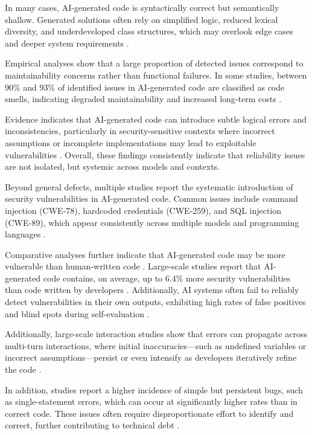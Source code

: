 \documentclass[conference]{IEEEtran}
\begin{document}
In many cases, AI-generated code is syntactically correct but semantically shallow. Generated solutions often rely on simplified logic, reduced lexical diversity, and underdeveloped class structures, which may overlook edge cases and deeper system requirements \cite{cotroneo_human-written_2025}.

Empirical analyses show that a large proportion of detected issues correspond to maintainability concerns rather than functional failures. In some studies, between 90\% and 93\% of identified issues in AI-generated code are classified as code smells, indicating degraded maintainability and increased long-term costs \cite{sabra_assessing_2025}.

Evidence indicates that AI-generated code can introduce subtle logical errors and inconsistencies, particularly in security-sensitive contexts where incorrect assumptions or incomplete implementations may lead to exploitable vulnerabilities \cite{sandoval_lost_2022}. Overall, these findings consistently indicate that reliability issues are not isolated, but systemic across models and contexts.

Beyond general defects, multiple studies report the systematic introduction of security vulnerabilities in AI-generated code. Common issues include command injection (CWE-78), hardcoded credentials (CWE-259), and SQL injection (CWE-89), which appear consistently across multiple models and programming languages \cite{schreiber_security_2026}.

Comparative analyses further indicate that AI-generated code may be more vulnerable than human-written code \cite{cotroneo_human-written_2025}. Large-scale studies report that AI-generated code contains, on average, up to 6.4\% more security vulnerabilities than code written by developers \cite{kim_security_2025}. Additionally, AI systems often fail to reliably detect vulnerabilities in their own outputs, exhibiting high rates of false positives and blind spots during self-evaluation \cite{gong_how_2025}.

Additionally, large-scale interaction studies show that errors can propagate across multi-turn interactions, where initial inaccuracies—such as undefined variables or incorrect assumptions—persist or even intensify as developers iteratively refine the code \cite{zhong_developer-llm_2025}.

In addition, studies report a higher incidence of simple but persistent bugs, such as single-statement errors, which can occur at significantly higher rates than in correct code. These issues often require disproportionate effort to identify and correct, further contributing to technical debt \cite{jesse_large_2023}.
\end{document}
